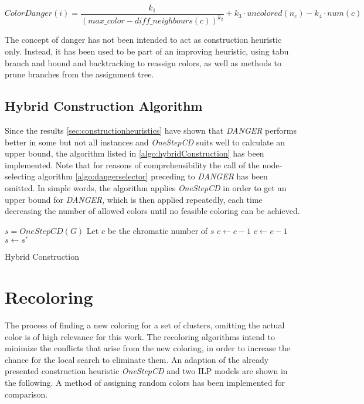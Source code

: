 $$ \mathit{ColorDanger}(i) = \frac{k_1}{(\mathit{max\_color} - \mathit{diff\_neighbours}(c))^{k_2}} + k_3 \cdot \mathit{uncolored}(n_c) - k_4 \cdot num(c) $$

The concept of danger has not been intended to act as construction heuristic only. Instead, it has been used to be part of an improving heuristic, using tabu branch and bound and backtracking to reassign colors, as well as methods to prune branches from the assignment tree.


\subsection{Hybrid Construction Algorithm}

Since the results \ref{sec:constructionheuristics} have shown that \textit{DANGER} performs better in some but not all instances and \textit{OneStepCD} suits well to calculate an upper bound, the algorithm listed in \ref{algo:hybridConstruction} has been implemented. Note that for reasons of comprehensibility the call of the node-selecting algorithm \ref{algo:dangerselector} preceding to \textit{DANGER} has been omitted. In simple words, the algorithm applies \textit{OneStepCD} in order to get an upper bound for \textit{DANGER}, which is then applied repeatedly, each time decreasing the number of allowed colors until no feasible coloring can be achieved.

\begin{algorithm}[h]

$s = \mathit{OneStepCD(G)}$\;
Let $c$ be the chromatic number of $s$\;
$c \gets c-1$\; 
 {
	$c \gets c-1$\;
	$s \gets s'$\;
}
\caption{Hybrid Construction}
\label{algo:hybridConstruction}
\end{algorithm}


\section{Recoloring}
\label{sec:recoloring}
The process of finding a new coloring for a set of clusters, omitting the actual color is of high relevance for this work. The recoloring algorithms intend to minimize the conflicts that arise from the new coloring, in order to increase the chance for the local search to eliminate them. An adaption of the already presented construction heuristic \textit{OneStepCD} and two ILP models are shown in the following. A method of assigning random colors has been implemented for comparison.

